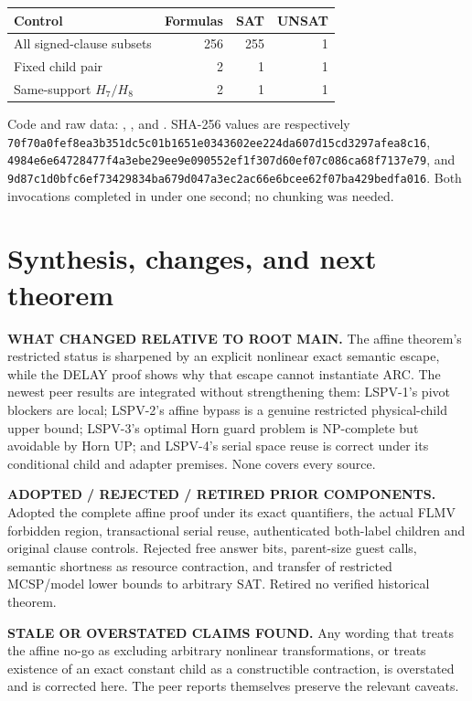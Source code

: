 \documentclass[11pt]{article}
\begin{document}
\begin{center}\small
\begin{tabular}{lrrr}\toprule
Control&Formulas&SAT&UNSAT\\\midrule
All signed-clause subsets&256&255&1\\
Fixed child pair&2&1&1\\
Same-support $H_7/H_8$&2&1&1\\\bottomrule
\end{tabular}
\end{center}

Code and raw data:
,
,
and
.
SHA-256 values are respectively
\texttt{70f70a0fef8ea3b351dc5c01b1651e0343602ee224da607d15cd3297afea8c16},
\texttt{4984e6e64728477f4a3ebe29ee9e090552ef1f307d60ef07c086ca68f7137e79},
and
\texttt{9d87c1d0bfc6ef73429834ba679d047a3ec2ac66e6bcee62f07ba429bedfa016}.
Both invocations completed in under one second; no chunking was needed.

\section{Synthesis, changes, and next theorem}
\textbf{WHAT CHANGED RELATIVE TO ROOT MAIN.}  The affine theorem's restricted
status is sharpened by an explicit nonlinear exact semantic escape, while the
DELAY proof shows why that escape cannot instantiate ARC.  The newest peer
results are integrated without strengthening them: LSPV-1's pivot blockers are
local; LSPV-2's affine bypass is a genuine restricted physical-child upper
bound; LSPV-3's optimal Horn guard problem is NP-complete but avoidable by Horn
UP; and LSPV-4's serial space reuse is correct under its conditional child and
adapter premises.  None covers every source.

\textbf{ADOPTED / REJECTED / RETIRED PRIOR COMPONENTS.}  Adopted the complete
affine proof under its exact quantifiers, the actual FLMV forbidden region,
transactional serial reuse, authenticated both-label children and original
clause controls.  Rejected free answer bits, parent-size guest calls, semantic
shortness as resource contraction, and transfer of restricted MCSP/model lower
bounds to arbitrary SAT.  Retired no verified historical theorem.

\textbf{STALE OR OVERSTATED CLAIMS FOUND.}  Any wording that treats the affine
no-go as excluding arbitrary nonlinear transformations, or treats existence of
an exact constant child as a constructible contraction, is overstated and is
corrected here.  The peer reports themselves preserve the relevant caveats.
\end{document}
